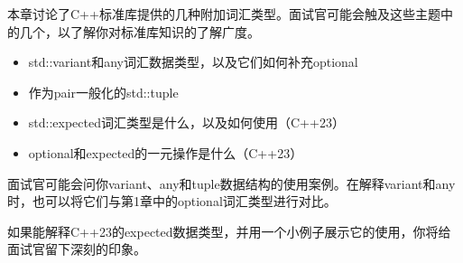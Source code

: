 
本章讨论了C++标准库提供的几种附加词汇类型。面试官可能会触及这些主题中的几个，以了解你对标准库知识的了解广度。


\begin{itemize}
\item
std::variant和any词汇数据类型，以及它们如何补充optional

\item
作为pair一般化的std::tuple

\item
std::expected词汇类型是什么，以及如何使用（C++23）

\item
optional和expected的一元操作是什么（C++23）
\end{itemize}


面试官可能会问你variant、any和tuple数据结构的使用案例。在解释variant和any时，也可以将它们与第1章中的optional词汇类型进行对比。

如果能解释C++23的expected数据类型，并用一个小例子展示它的使用，你将给面试官留下深刻的印象。
